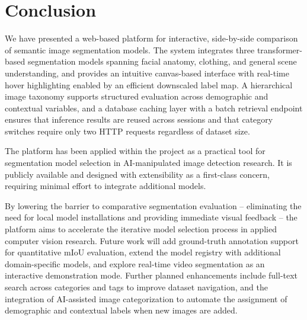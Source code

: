 \documentclass[conference,a4paper,flushend]{iaria}
\begin{document}
\section{Conclusion}
\label{sec:conclusion}

We have presented a web-based platform for interactive, side-by-side comparison of semantic image segmentation models. The system integrates three transformer-based segmentation models spanning facial anatomy, clothing, and general scene understanding, and provides an intuitive canvas-based interface with real-time hover highlighting enabled by an efficient downscaled label map. A hierarchical image taxonomy supports structured evaluation across demographic and contextual variables, and a database caching layer with a batch retrieval endpoint ensures that inference results are reused across sessions and that category switches require only two HTTP requests regardless of dataset size.

The platform has been applied within the  project as a practical tool for segmentation model selection in AI-manipulated image detection research. It is publicly available and designed with extensibility as a first-class concern, requiring minimal effort to integrate additional models.

By lowering the barrier to comparative segmentation evaluation -- eliminating the need for local model installations and providing immediate visual feedback -- the platform aims to accelerate the iterative model selection process in applied computer vision research. Future work will add ground-truth annotation support for quantitative mIoU evaluation, extend the model registry with additional domain-specific models, and explore real-time video segmentation as an interactive demonstration mode. Further planned enhancements include full-text search across categories and tags to improve dataset navigation, and the integration of AI-assisted image categorization to automate the assignment of demographic and contextual labels when new images are added.


\printbibliography
\end{document}
